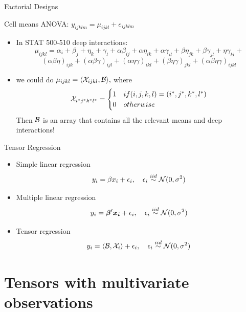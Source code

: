 \documentclass{beamer}
\begin{document}
\begin{frame}{Factorial Designs }

Cell means ANOVA:
\quad
$
y_{ijklm} = \mu_{ijkl} + e_{ijklm}
$

\begin{itemize}

\item In STAT 500-510 deep interactions:
$$
\mu_{ijkl} = \alpha_i + \beta_j + \eta_k + \gamma_l +
\alpha\beta_{ij}+
\alpha\eta_{ik}+
\alpha\gamma_{il}+
\beta\eta_{jk}+
\beta\gamma_{jl}+
\eta\gamma_{kl}+$$$$
(\alpha\beta\eta)_{ijk}+
(\alpha\beta\gamma)_{ijl}+
(\alpha\eta\gamma)_{ikl}+
(\beta\eta\gamma)_{jkl}+
(\alpha\beta\eta\gamma)_{ijkl}
$$
\item we could do
$
\mu_{ijkl} = \langle\mathcal X_{ijkl},\mathcal B\rangle,
$
where
$$
\mathcal X_{i^*j^*k^*l^*} = \begin{cases} 
      1 & if (i,j,k,l)=(i^*,j^*,k^*,l^*)  \\
      0 & otherwise
   \end{cases}
$$
Then $\mathcal B$ is an array that contains all the relevant means and deep interactions!
\end{itemize}

\end{frame}





\begin{frame}{Tensor Regression}
\begin{itemize}
\item Simple linear regression
		$$y_i = \beta x_i + \epsilon_i, \quad \epsilon_i \overset{iid}{\sim} \operatorname{\mathcal N}(0,\sigma^2)$$
\item Multiple linear regression		
$$  y_i = \bm{\beta}' \bm{x_i} + \epsilon_i, \quad \epsilon_i \overset{iid}{\sim} \operatorname{\mathcal N}(0,\sigma^2)$$
\item Tensor regression
$$  y_i = \langle \mathcal B, \mathcal X_i\rangle + \epsilon_i, \quad \epsilon_i \overset{iid}{\sim} \operatorname{\mathcal N}(0,\sigma^2)$$
  	\end{itemize}
\end{frame}

\section{Tensors  with multivariate observations}
\end{document}
